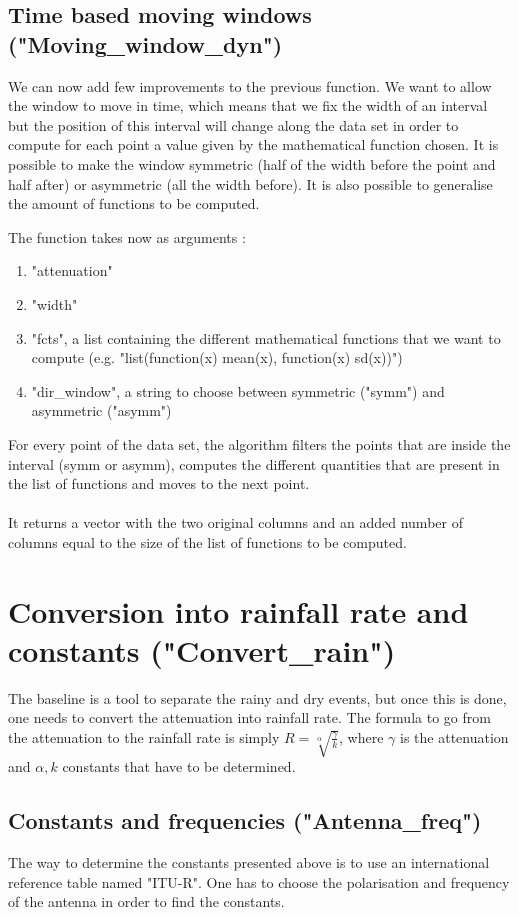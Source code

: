 \documentclass[a4wide,12pt]{article}
\begin{document}
\subsection{Time based moving windows ("Moving\_window\_dyn")}
We can now add few improvements to the previous function. We want to allow the window to move in time, which means that we fix the width of an interval but the position of this interval will change along the data set in order to compute for each point a value given by the mathematical function chosen. It is possible to make the window symmetric (half of the width before the point and half after) or asymmetric (all the width before). It is also possible to generalise the amount of functions to be computed. 

The function takes now as arguments : 

\begin{enumerate}
\item "attenuation"
\item "width"
\item "fcts", a list containing the different mathematical functions that we want to compute (e.g. "list(function(x) mean(x), function(x) sd(x))")
\item "dir\_window", a string to choose between symmetric ("symm") and asymmetric ("asymm")
\end{enumerate}

For every point of the data set, the algorithm filters the points that are inside the interval (symm or asymm), computes the different quantities that are present in the list of functions and moves to the next point.
\\ \\
It returns a vector with the two original columns and an added number of columns equal to the size of the list of functions to be computed.

\section{Conversion into rainfall rate and constants ("Convert\_rain")}
The baseline is a tool to separate the rainy and dry events, but once this is done, one needs to convert the attenuation into rainfall rate. The formula to go from the attenuation to the rainfall rate is simply $R = \sqrt[\alpha]{\frac{\gamma}{k}}$, where $\gamma$ is the attenuation and $\alpha, k$ constants that have to be determined. 

\subsection{Constants and frequencies ("Antenna\_freq")}
The way to determine the constants presented above is to use an international reference table named "ITU-R". One has to choose the polarisation and frequency of the antenna in order to find the constants. 
\end{document}

